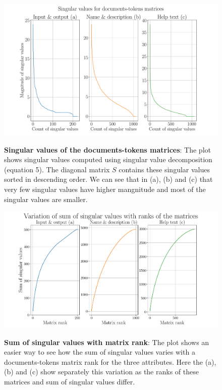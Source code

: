 \begin{figure}[h]
\begin{centering}
    {\includegraphics[scale=0.35]{figures/Singular_values.pdf}}
    \caption[Singular values]{\textbf{Singular values of the documents-tokens matrices}: The plot shows singular values computed using singular value decomposition (equation 5). The diagonal matrix $S$ contains these singular values sorted in descending order. We can see that in (a), (b) and (c) that very few singular values have higher mangnitude and most of the singular values are smaller. }
\end{centering}
\end{figure}

\begin{figure}[h]
\begin{centering}
    {\includegraphics[scale=0.4]{figures/Sum_singular_ranks.pdf}}
    \caption[Singular values with ranks]{\textbf{Sum of singular values with matrix rank}: The plot shows an easier way to see how the sum of singular values varies with a documents-tokens matrix rank for the three attributes. Here the (a), (b) and (c) show separately this variation as the ranks of these matrices and sum of singular values differ.}
\end{centering}
\end{figure}

